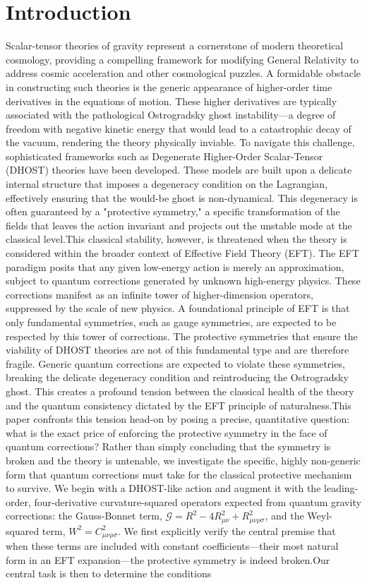 \documentclass[twocolumn]{aastex631}
\begin{document}
\section{Introduction}
\label{sec:intro}
Scalar-tensor theories of gravity represent a cornerstone of modern theoretical cosmology, providing a compelling framework for modifying General Relativity to address cosmic acceleration and other cosmological puzzles. A formidable obstacle in constructing such theories is the generic appearance of higher-order time derivatives in the equations of motion. These higher derivatives are typically associated with the pathological Ostrogradsky ghost instability---a degree of freedom with negative kinetic energy that would lead to a catastrophic decay of the vacuum, rendering the theory physically inviable. To navigate this challenge, sophisticated frameworks such as Degenerate Higher-Order Scalar-Tensor (DHOST) theories have been developed. These models are built upon a delicate internal structure that imposes a degeneracy condition on the Lagrangian, effectively ensuring that the would-be ghost is non-dynamical. This degeneracy is often guaranteed by a "protective symmetry," a specific transformation of the fields that leaves the action invariant and projects out the unstable mode at the classical level.This classical stability, however, is threatened when the theory is considered within the broader context of Effective Field Theory (EFT). The EFT paradigm posits that any given low-energy action is merely an approximation, subject to quantum corrections generated by unknown high-energy physics. These corrections manifest as an infinite tower of higher-dimension operators, suppressed by the scale of new physics. A foundational principle of EFT is that only fundamental symmetries, such as gauge symmetries, are expected to be respected by this tower of corrections. The protective symmetries that ensure the viability of DHOST theories are not of this fundamental type and are therefore fragile. Generic quantum corrections are expected to violate these symmetries, breaking the delicate degeneracy condition and reintroducing the Ostrogradsky ghost. This creates a profound tension between the classical health of the theory and the quantum consistency dictated by the EFT principle of naturalness.This paper confronts this tension head-on by posing a precise, quantitative question: what is the exact price of enforcing the protective symmetry in the face of quantum corrections? Rather than simply concluding that the symmetry is broken and the theory is untenable, we investigate the specific, highly non-generic form that quantum corrections must take for the classical protective mechanism to survive. We begin with a DHOST-like action and augment it with the leading-order, four-derivative curvature-squared operators expected from quantum gravity corrections: the Gauss-Bonnet term, $\mathcal{G} = R^2 - 4R_{\mu\nu}^2 + R_{\mu\nu\rho\sigma}^2$, and the Weyl-squared term, $W^2 = C_{\mu\nu\rho\sigma}^2$. We first explicitly verify the central premise that when these terms are included with constant coefficients---their most natural form in an EFT expansion---the protective symmetry is indeed broken.Our central task is then to determine the conditions 
\end{document}
